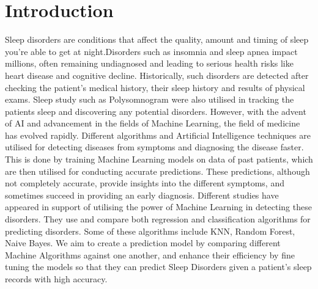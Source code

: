 \documentclass[10pt,twocolumn,letterpaper]{article}
\begin{document}

\section{Introduction}
Sleep disorders are conditions that affect the quality, amount and timing of sleep you're able to get at night.Disorders such as insomnia and sleep apnea impact millions, often remaining undiagnosed and leading to serious health risks like heart disease and cognitive decline. Historically, such disorders are detected after checking the patient's medical history, their sleep history and results of physical exams. Sleep study such as Polysomnogram were also utilised in tracking the patients sleep and discovering any potential disorders. However, with the advent of AI and advancement in the fields of Machine Learning, the field of medicine has evolved rapidly. Different algorithms and Artificial Intelligence techniques are utilised for detecting diseases from symptoms and diagnosing the disease faster. This is done by training Machine Learning models on data of past patients, which are then utilised for conducting accurate predictions. These predictions, although not completely accurate, provide insights into the different symptoms, and sometimes succeed in providing an early diagnosis. Different studies have appeared in support of utilising the power of Machine Learning in detecting these disorders. They use and compare both regression and classification algorithms for predicting disorders. Some of these algorithms include KNN, Random Forest, Naive Bayes. We aim to create a prediction model by comparing different Machine Algorithms against one another, and enhance their efficiency by fine tuning the models so that they can predict Sleep Disorders given a patient's sleep records with high accuracy.
\end{document}
